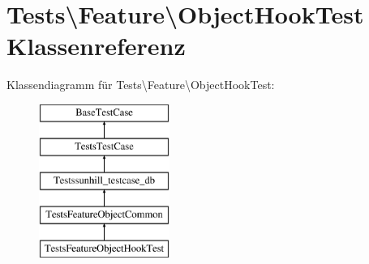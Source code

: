 \hypertarget{classTests_1_1Feature_1_1ObjectHookTest}{}\section{Tests\textbackslash{}Feature\textbackslash{}Object\+Hook\+Test Klassenreferenz}
\label{classTests_1_1Feature_1_1ObjectHookTest}
Klassendiagramm für Tests\textbackslash{}Feature\textbackslash{}Object\+Hook\+Test\+:\begin{figure}[H]
\begin{center}
\leavevmode
\includegraphics[height=5.000000cm]{dd/dfe/classTests_1_1Feature_1_1ObjectHookTest}
\end{center}
\end{figure}
